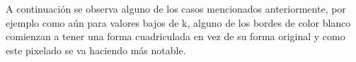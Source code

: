 \documentclass[a4paper]{article}
\newcounter{col}
\begin{document}
A continuación se observa alguno de los casos mencionados anteriormente, por ejemplo como aún para valores bajos de k, alguno de los bordes de color blanco comienzan a tener una forma cuadriculada en vez de su forma original y como este pixelado se va haciendo m\'as notable.  
 \begin{figure}[H]
\centering
{}
\end{figure}
 \begin{figure}[H]
\centering
{}
\end{figure}
\end{document}
